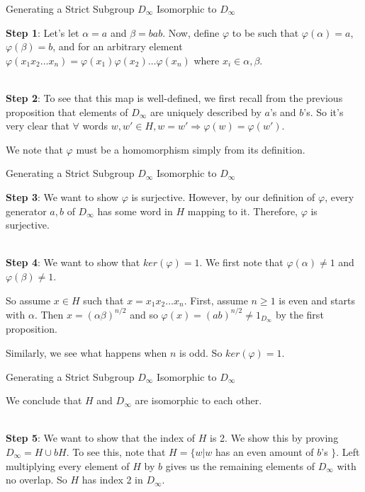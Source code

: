 \documentclass[usenames,dvipsnames]{beamer}
\begin{document}
\begin{frame}{Generating a Strict Subgroup $D_\infty$ Isomorphic to $D_\infty$}

\textbf{Step 1}: Let's let $\alpha=a$ and $\beta=bab$. Now, define $\varphi$ to be such that
$\varphi(\alpha)=a$, $\varphi(\beta)=b$, and for an arbitrary element $\varphi(x_{1}x_{2}\ldots
x_{n})=\varphi(x_{1})\varphi(x_{2})\ldots \varphi(x_{n})$ where $x_{i}\in {\alpha, \beta}$. \\~\\

\pause

\textbf{Step 2}: To see that this map is well-defined, we first recall from the previous proposition that
elements of $D_\infty$ are uniquely described by $a$'s and $b$'s. So it's very clear that $\forall$ words
$w,w'\in H, w=w' \Rightarrow \varphi(w)=\varphi(w')$. 

\pause

We note that $\varphi$ must be a homomorphism simply from its definition.

\end{frame}

\begin{frame}{Generating a Strict Subgroup $D_\infty$ Isomorphic to $D_\infty$}

\textbf{Step 3}: We want to show $\varphi$ is surjective. However, by our definition of $\varphi$, every
generator ${a,b}$ of $D_\infty$ has some word in $H$ mapping to it. Therefore, $\varphi$ is surjective.
\\~\\

\pause

\textbf{Step 4}: We want to show that $ker(\varphi)={1}$. We first note that $\varphi(\alpha)\neq 1$ and
$\varphi(\beta)\neq 1$.  

\pause

So assume $x\in H$ such that $x=x_{1}x_{2}\ldots x_{n}$. First, assume $n\geq 1$ is even and starts with
$\alpha$. Then $x=(\alpha\beta)^{n/2}$ and so $\varphi(x)=(ab)^{n/2}\neq 1_{D_\infty}$ by the first
proposition. 

\pause

Similarly, we see what happens when $n$ is odd. So $ker(\varphi)={1}$.

\end{frame}

\begin{frame}{Generating a Strict Subgroup $D_\infty$ Isomorphic to $D_\infty$}

We conclude that $H$ and $D_\infty$ are isomorphic to each other. \\~\\

\pause

\textbf{Step 5}: We want to show that the index of $H$ is 2. We show this by proving $D_\infty=H\cup bH$.
\pause To see this, note that $H=\{ w | w $ has an even amount of $b$'s $\}$. Left multiplying every
element of $H$ by $b$ gives us the remaining elements of $D_\infty$ with no overlap. So $H$ has index 2 in
$D_\infty$.

\end{frame}
\end{document}

